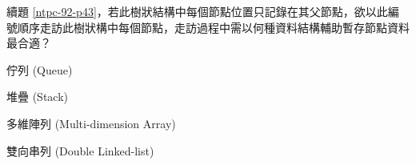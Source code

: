 \ifx\ntpcNinetyTwo\undefined[92學年基北區] \fi
續題 \ref{ntpc-92-p43}，若此樹狀結構中每個節點位置只記錄在其父節點，欲以此編號順序走訪此樹狀構中每個節點，走訪過程中需以何種資料結構輔助暫存節點資料最合適？
  \begin{optionlist}
  \item 佇列 (Queue)\label{ntpc-92-a44}
  \item 堆疊 (Stack)
  \item 多維陣列 (Multi-dimension Array)
  \item 雙向串列 (Double Linked-list)
  \end{optionlist}